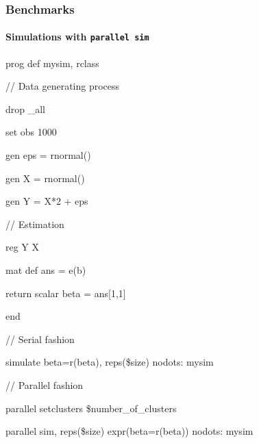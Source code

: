 \documentclass[9pt,\ExtraDocOpts]{beamer}
\begin{document}
\begin{frame}[t]
	\frametitle{Benchmarks}
	\framesubtitle{Simulations with \tt{parallel sim}}
	\begin{semiverbatim}
		\scriptsize
prog def mysim, rclass

\hspace{.5cm}// Data generating process

\hspace{.5cm}drop \_all

\hspace{.5cm}set obs 1000 

\hspace{.5cm}gen eps = rnormal()

\hspace{.5cm}gen X   = rnormal()

\hspace{.5cm}gen Y   = X*2 + eps 


\hspace{.5cm}// Estimation

\hspace{.5cm}reg Y X 

\hspace{.5cm}mat def ans = e(b)

\hspace{.5cm}return scalar beta = ans[1,1]

end


// Serial fashion

simulate beta=r(beta), reps(\$size) nodots: mysim


// Parallel fashion

parallel setclusters \$number\_of\_clusters

parallel sim, reps(\$size) expr(beta=r(beta)) nodots: mysim
	\end{semiverbatim}
	
\end{frame}
\end{document}
